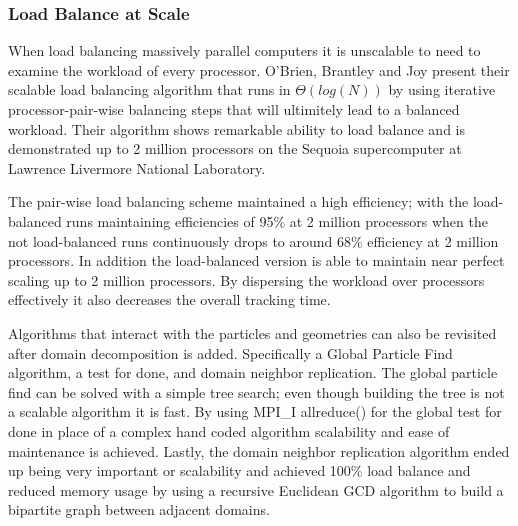 \subsubsection*{Load Balance at Scale}

%
When load balancing massively parallel computers it is unscalable to need to examine the workload of every processor.
%
O'Brien, Brantley and Joy present their scalable load balancing algorithm that runs in $\Theta ( log ( N ) )$ by using iterative processor-pair-wise balancing steps that will ultimitely lead to a balanced workload.
%
Their algorithm shows remarkable ability to load balance and is demonstrated up to 2 million processors on the Sequoia supercomputer at Lawrence Livermore National Laboratory.
~\cite{o2013scalable}
%

%
The pair-wise load balancing scheme maintained a high efficiency; with the load-balanced runs maintaining efficiencies of 95\% at 2 million processors
when the not load-balanced runs continuously drops to around 68\% efficiency at 2 million processors.
%
In addition the load-balanced version is able to maintain near perfect scaling up to 2 million processors.
%
By dispersing the workload over processors effectively it also decreases the overall tracking time.
~\cite{o2013scalable}
%

Algorithms that interact with the particles and geometries can also be revisited after domain decomposition is added.
%
Specifically a Global Particle Find algorithm, a test for done, and domain neighbor replication.
%
The global particle find can be solved with a simple tree search; even though building the tree is not a scalable algorithm it is fast.
%
By using MPI\_I allreduce() for the global test for done in place of a complex hand coded algorithm scalability and ease of maintenance is achieved.
%
Lastly, the domain neighbor replication algorithm ended up being very important or scalability and achieved 100\% load balance and reduced memory usage by using a recursive Euclidean GCD algorithm to build a bipartite graph between adjacent domains. ~\cite{o2015particle}
%


